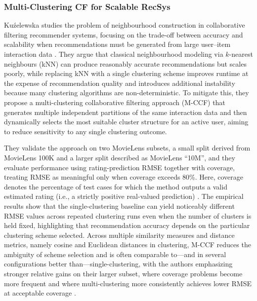 \documentclass[12pt,a4paper]{article}
\begin{document}
\subsubsection{Multi-Clustering CF for Scalable RecSys}
Kuźelewska studies the problem of neighbourhood construction in collaborative filtering recommender systems, focusing on the trade-off between accuracy and scalability when recommendations must be generated from large user--item interaction data \cite{kuzelewska2020}. They argue that classical neighbourhood modeling via $k$-nearest neighbours (kNN) can produce reasonably accurate recommendations but scales poorly, while replacing kNN with a single clustering scheme improves runtime at the expense of recommendation quality and introduces additional instability because many clustering algorithms are non-deterministic. To mitigate this, they propose a multi-clustering collaborative filtering approach (M-CCF) that generates multiple independent partitions of the same interaction data and then dynamically selects the most suitable cluster structure for an active user, aiming to reduce sensitivity to any single clustering outcome.

They validate the approach on two MovieLens subsets, a small split derived from MovieLens 100K and a larger split described as MovieLens ``10M'', and they evaluate performance using rating-prediction RMSE together with coverage, treating RMSE as meaningful only when coverage exceeds 80\%. Here, coverage denotes the percentage of test cases for which the method outputs a valid estimated rating (i.e., a strictly positive real-valued prediction) \cite{kuzelewska2020}. The empirical results show that the single-clustering baseline can yield noticeably different RMSE values across repeated clustering runs even when the number of clusters is held fixed, highlighting that recommendation accuracy depends on the particular clustering scheme selected. Across multiple similarity measures and distance metrics, namely cosine and Euclidean distances in clustering, M-CCF reduces the ambiguity of scheme selection and is often comparable to---and in several configurations better than---single-clustering, with the authors emphasizing stronger relative gains on their larger subset, where coverage problems become more frequent and where multi-clustering more consistently achieves lower RMSE at acceptable coverage \cite{kuzelewska2020}.
\end{document}
